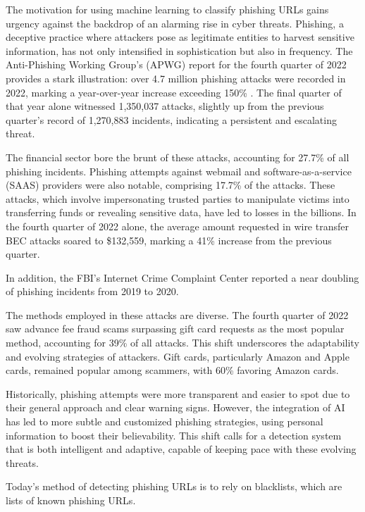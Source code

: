 \documentclass{article}
\begin{document}
    The motivation for using machine learning to classify phishing URLs gains urgency against the backdrop of an alarming rise in cyber threats.
    Phishing, a deceptive practice where attackers pose as legitimate entities to harvest sensitive information, has not only intensified in sophistication but also in frequency.
    The Anti-Phishing Working Group's (APWG) report for the fourth quarter of 2022 provides a stark illustration: over 4.7 million phishing attacks were recorded in 2022, marking a year-over-year increase exceeding 150\% \cite{PhishingActivityTrendsReport}.
    The final quarter of that year alone witnessed 1,350,037 attacks, slightly up from the previous quarter's record of 1,270,883 incidents, indicating a persistent and escalating threat.

    The financial sector bore the brunt of these attacks, accounting for 27.7\% of all phishing incidents.
    Phishing attempts against webmail and software-as-a-service (SAAS) providers were also notable, comprising 17.7\% of the attacks.
    These attacks, which involve impersonating trusted parties to manipulate victims into transferring funds or revealing sensitive data, have led to losses in the billions.
    In the fourth quarter of 2022 alone, the average amount requested in wire transfer BEC attacks soared to \$132,559, marking a 41\% increase from the previous quarter.

    In addition, the FBI’s Internet Crime Complaint Center reported a near doubling of phishing incidents from 2019 to 2020.

    The methods employed in these attacks are diverse.
    The fourth quarter of 2022 saw advance fee fraud scams surpassing gift card requests as the most popular method, accounting for 39\% of all attacks.
    This shift underscores the adaptability and evolving strategies of attackers.
    Gift cards, particularly Amazon and Apple cards, remained popular among scammers, with 60\% favoring Amazon cards.

    Historically, phishing attempts were more transparent and easier to spot due to their general approach and clear warning signs.
    However, the integration of AI has led to more subtle and customized phishing strategies, using personal information to boost their believability.
    This shift calls for a detection system that is both intelligent and adaptive, capable of keeping pace with these evolving threats.

    Today's method of detecting phishing URLs is to rely on blacklists, which are lists of known phishing URLs.
\end{document}
